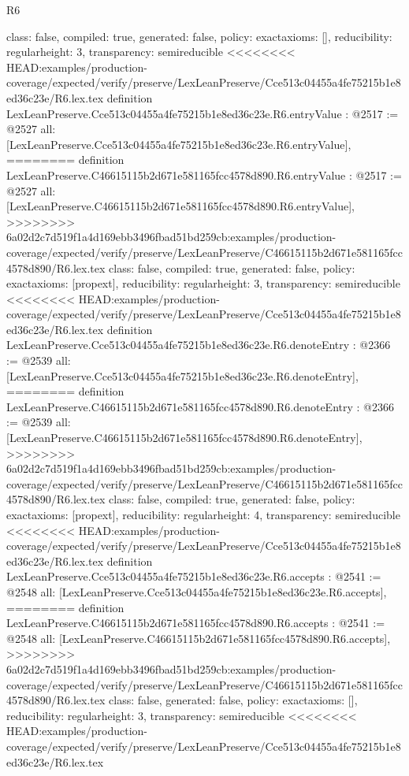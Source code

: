 \begin{lexlean}{R6}
\begin{coremodule}
{{{{{{{{{{{{{{{  class: false,
  compiled: true,
  generated: false,
  policy: exact{axioms: []},
  reducibility: regular{height: 3},
  transparency: semireducible
}
<<<<<<<< HEAD:examples/production-coverage/expected/verify/preserve/LexLeanPreserve/Cce513c04455a4fe75215b1e8ed36c23e/R6.lex.tex
definition LexLeanPreserve.Cce513c04455a4fe75215b1e8ed36c23e.R6.entryValue : @2517 := @2527 {
  all: [LexLeanPreserve.Cce513c04455a4fe75215b1e8ed36c23e.R6.entryValue],
========
definition LexLeanPreserve.C46615115b2d671e581165fcc4578d890.R6.entryValue : @2517 := @2527 {
  all: [LexLeanPreserve.C46615115b2d671e581165fcc4578d890.R6.entryValue],
>>>>>>>> 6a02d2c7d519f1a4d169ebb3496fbad51bd259cb:examples/production-coverage/expected/verify/preserve/LexLeanPreserve/C46615115b2d671e581165fcc4578d890/R6.lex.tex
  class: false,
  compiled: true,
  generated: false,
  policy: exact{axioms: [propext]},
  reducibility: regular{height: 3},
  transparency: semireducible
}
<<<<<<<< HEAD:examples/production-coverage/expected/verify/preserve/LexLeanPreserve/Cce513c04455a4fe75215b1e8ed36c23e/R6.lex.tex
definition LexLeanPreserve.Cce513c04455a4fe75215b1e8ed36c23e.R6.denoteEntry : @2366 := @2539 {
  all: [LexLeanPreserve.Cce513c04455a4fe75215b1e8ed36c23e.R6.denoteEntry],
========
definition LexLeanPreserve.C46615115b2d671e581165fcc4578d890.R6.denoteEntry : @2366 := @2539 {
  all: [LexLeanPreserve.C46615115b2d671e581165fcc4578d890.R6.denoteEntry],
>>>>>>>> 6a02d2c7d519f1a4d169ebb3496fbad51bd259cb:examples/production-coverage/expected/verify/preserve/LexLeanPreserve/C46615115b2d671e581165fcc4578d890/R6.lex.tex
  class: false,
  compiled: true,
  generated: false,
  policy: exact{axioms: [propext]},
  reducibility: regular{height: 4},
  transparency: semireducible
}
<<<<<<<< HEAD:examples/production-coverage/expected/verify/preserve/LexLeanPreserve/Cce513c04455a4fe75215b1e8ed36c23e/R6.lex.tex
definition LexLeanPreserve.Cce513c04455a4fe75215b1e8ed36c23e.R6.accepts : @2541 := @2548 {
  all: [LexLeanPreserve.Cce513c04455a4fe75215b1e8ed36c23e.R6.accepts],
========
definition LexLeanPreserve.C46615115b2d671e581165fcc4578d890.R6.accepts : @2541 := @2548 {
  all: [LexLeanPreserve.C46615115b2d671e581165fcc4578d890.R6.accepts],
>>>>>>>> 6a02d2c7d519f1a4d169ebb3496fbad51bd259cb:examples/production-coverage/expected/verify/preserve/LexLeanPreserve/C46615115b2d671e581165fcc4578d890/R6.lex.tex
  class: false,
  generated: false,
  policy: exact{axioms: []},
  reducibility: regular{height: 3},
  transparency: semireducible
}
<<<<<<<< HEAD:examples/production-coverage/expected/verify/preserve/LexLeanPreserve/Cce513c04455a4fe75215b1e8ed36c23e/R6.lex.tex
}}}}}}}}}}}}}}}}}
\end{coremodule}
\end{lexlean}
